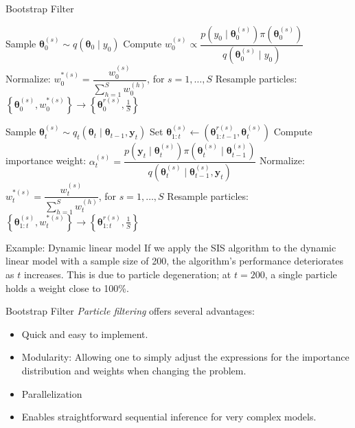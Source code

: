 \documentclass[12pt, compress]{beamer}
\begin{document}
\begin{frame}{Bootstrap Filter}
	\begin{algorithm}[H]
		\caption{The \textit{particle filter} algorithm}
		\label{Alg:PF}
		{\tiny{
		\begin{algorithmic}[1]
			\State Sample $\bm{\theta}_0^{(s)} \sim q(\bm{\theta}_0 \mid y_0)$
			\State Compute $w_0^{(s)} \propto 
			\dfrac{p(y_0 \mid \bm{\theta}_0^{(s)}) \pi(\bm{\theta}_0^{(s)})}
			{q(\bm{\theta}_0^{(s)} \mid y_0)}$
			\EndFor
			\State Normalize: $w_0^{*(s)} = \dfrac{w_0^{(s)}}{\sum_{h=1}^{S} w_0^{(h)}}$, for $s = 1, \dots, S$
			\State Resample particles: $\left\{\bm{\theta}_0^{(s)}, w_0^{*(s)}\right\} \rightarrow \left\{\bm{\theta}_0^{r(s)}, \frac{1}{S} \right\}$
			
			\State Sample $\bm{\theta}_t^{(s)} \sim q_t(\bm{\theta}_t \mid \bm{\theta}_{t-1}, \bm{y}_t)$
			\State Set $\bm{\theta}_{1:t}^{(s)} \gets (\bm{\theta}_{1:t-1}^{r(s)}, \bm{\theta}_t^{(s)})$
			\State Compute importance weight: $\alpha_t^{(s)} = 
			\dfrac{p(\bm{y}_t \mid \bm{\theta}_t^{(s)}) \pi(\bm{\theta}_t^{(s)} \mid \bm{\theta}_{t-1}^{(s)})}
			{q(\bm{\theta}_t^{(s)} \mid \bm{\theta}_{t-1}^{(s)}, \bm{y}_t)}$
			\EndFor
			\State Normalize: $w_t^{*(s)} = \dfrac{w_t^{(s)}}{\sum_{h=1}^{S} w_t^{(h)}}$, for $s = 1, \dots, S$
			\State Resample particles: $\left\{\bm{\theta}_{1:t}^{(s)}, w_t^{*(s)}\right\} \rightarrow \left\{\bm{\theta}_{1:t}^{r(s)}, \frac{1}{S} \right\}$
			\EndFor
		\end{algorithmic}
	}}
	\end{algorithm}
\end{frame}

\begin{frame}{Example: Dynamic linear model}
If we apply the SIS algorithm to the dynamic linear model with a sample size of 200, the algorithm's performance deteriorates as $t$ increases. This is due to particle degeneration; at $t=200$, a single particle holds a weight close to 100\%.
\end{frame}

\begin{frame}{Bootstrap Filter}
	\textit{Particle filtering} offers several advantages:
	\begin{itemize}
		\item Quick and easy to implement.
		\item Modularity: Allowing one to simply adjust the expressions for the importance distribution and weights when changing the problem.
		\item Parallelization 
		\item Enables straightforward sequential inference for very complex models.  
	\end{itemize}
\end{frame}
\end{document}
